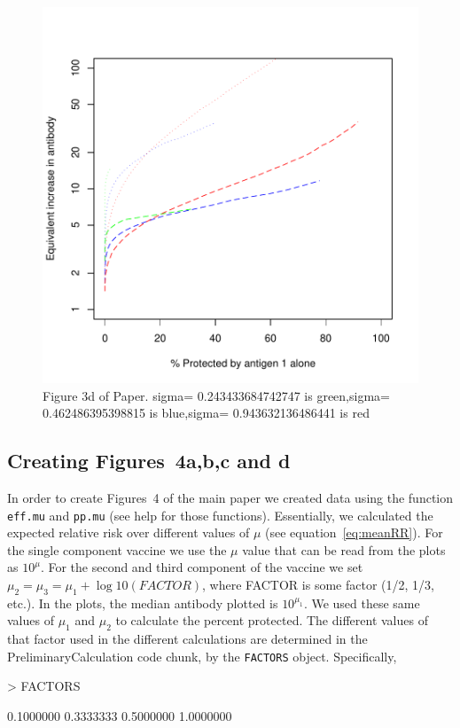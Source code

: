 \documentclass{article}[12pt]
\begin{document}
\begin{figure}
\caption{Figure 3d of Paper.
sigma= 0.243433684742747  is  green,sigma= 0.462486395398815  is  blue,sigma= 0.943632136486441  is  red
 \label{fig:3d} }
\includegraphics{hbimdetails-fig3d}
\end{figure}





\subsection{Creating Figures~4a,b,c and d}


In order to create Figures~4 of the main paper we created data using the function \texttt{eff.mu} and \texttt{pp.mu}
(see help for those functions). Essentially, we  calculated the expected relative risk over different values of $\mu$ 
(see equation~\ref{eq:meanRR}). For the single component vaccine we use the $\mu$ value that can be read from the plots
as $10^\mu$. 
For the second and third component of the vaccine we set $\mu_2=\mu_3=\mu_1+\log10(FACTOR)$, where FACTOR is some factor (1/2, 1/3, etc.).
In the plots, the median antibody plotted is $10^{\mu_1}$.  We used these same
values of $\mu_1$ and $\mu_2$ to calculate the percent protected.  
The different values of that factor used in the different calculations 
are determined in the PreliminaryCalculation code chunk, by the \texttt{FACTORS} object.
Specifically, 
\begin{Schunk}
\begin{Sinput}
> FACTORS
\end{Sinput}
\begin{Soutput}
[1] 0.1000000 0.3333333 0.5000000 1.0000000
\end{Soutput}
\end{Schunk}
\end{document}

